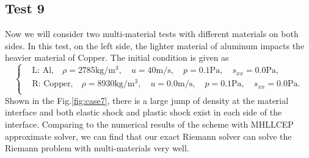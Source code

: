\documentclass{article}
\numberwithin{equation}{section}
\numberwithin{table}{section}
\begin{document}
\subsection{Test 9}
Now we will consider two multi-material tests with different materials on both sides. In this test, on the left side, the lighter material of aluminum impacts the heavier material of Copper. The initial condition is given as
\begin{equation}
 \left\{ \begin{aligned}
	 &	 \text{L: Al,}\quad  \rho = 2785 \text{kg}/\text{m}^3, \quad  u = 40\text{m}/\text{s}, \quad  p = 0.1\text{Pa}, \quad  s_{xx}=0.0\text{Pa},\\
	 &	 \text{R: Copper,}\quad  \rho = 8930\text{kg}/\text{m}^3, \quad  u = 0.0\text{m}/\text{s}, \quad  p =0.1\text{Pa}, \quad  s_{xx}=0.0\text{Pa}.\\
   \end{aligned}
 \right.
\end{equation}
Shown in the Fig.\ref{fig:case7}, there is a large jump of density at the material interface and  both elastic shock and plastic shock exist in each side of the interface. Comparing to the numerical results of the scheme with MHLLCEP approximate solver, we can find that our exact Riemann solver can solve the Riemann problem with multi-materials very well.
\end{document}
